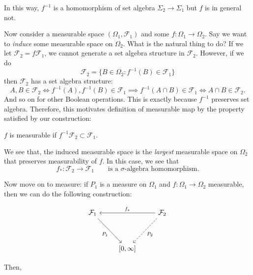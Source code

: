 In this way, $f^{-1}$ is a homomorphism of set algebra $\Sigma_2 \to  \Sigma_1$ but $f$ is in general not.

Now consider a measurable space $(\Omega_1, \mathcal{F}_1)$ and some $f: \Omega_1 \to  \Omega_2$. Say we want to \textit{induce } some measurable space on $\Omega_2$. What is the natural thing to do? If we let $\mathcal{F}_2 = f \mathcal{F}_1$, we cannot generate a set algebra structure in $\mathcal{F}_2$. However, if we do
\[
	\mathcal{F}_2 = \{B \in \Omega_2: f^{-1} (B) \in \mathcal{F}_1\} 
\] 
then $\mathcal{F}_2$ has a set algebra structure:
\[
	A, B \in \mathcal{F}_2 \iff  f^{-1}(A), f^{-1} (B) \in \mathcal{F}_1 \implies f^{-1}(A \cap B) \in \mathcal{F}_1 \iff  A \cap B \in \mathcal{F}_2
.\] 
And so on for other Boolean operations. This is exactly because $f^{-1}$ preserves set algebra. Therefore, this motivates definition of measurable map by the property satisfied by our construction:
\begin{definition}
	$f$ is measurable if  $f^{-1} \mathcal{F}_2 \subset \mathcal{F}_1$.
\end{definition}

We see that, the induced measurable space is the  \textit{largest} measurable space on $\Omega_2$ that preserves measurability of $f$. In this case, we see that
\[
	f_*: \mathcal{F}_2 \to  \mathcal{F}_1 \qquad \text{is a $\sigma$-algebra homomorphism}
.\] 

Now move on to measure: if $P_1$ is a measure on $\Omega_1$ and $f: \Omega_1 \to  \Omega_2$ measurable, then we can do the following construction:

\begin{equation}\begin{tikzcd}
	{\mathcal{F}_1} && {\mathcal{F}_2} \\
	\\
	& {[0,\infty]}
	\arrow["{f_*}"', from=1-3, to=1-1]
	\arrow["{P_1}"', from=1-1, to=3-2]
	\arrow["{P_2}", dashed, from=1-3, to=3-2]
\end{tikzcd}
\end{equation}

Then, 

